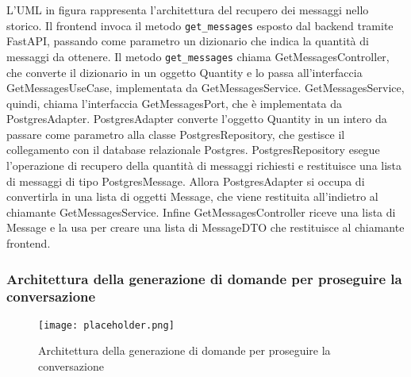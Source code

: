 L'UML in figura rappresenta l'architettura del recupero dei messaggi nello storico.
Il frontend invoca il metodo \texttt{get\_messages} esposto dal backend tramite FastAPI, passando come parametro un dizionario che indica la quantità di messaggi da ottenere.
Il metodo \texttt{get\_messages} chiama GetMessagesController, che converte il dizionario in un oggetto Quantity e lo passa all'interfaccia GetMessagesUseCase, implementata da GetMessagesService.
GetMessagesService, quindi, chiama l'interfaccia GetMessagesPort, che è implementata da PostgresAdapter.
PostgresAdapter converte l'oggetto Quantity in un intero da passare come parametro alla classe PostgresRepository, che gestisce il collegamento con il database relazionale Postgres. 
PostgresRepository esegue l’operazione di recupero della quantità di messaggi richiesti e restituisce una lista di messaggi di tipo PostgresMessage.
Allora PostgresAdapter si occupa di convertirla in una lista di oggetti Message, che viene restituita all'indietro al chiamante GetMessagesService.
Infine GetMessagesController riceve una lista di Message e la usa per creare una lista di MessageDTO che restituisce al chiamante frontend.

\newpage


\subsubsection{Architettura della generazione di domande per proseguire la conversazione}
\label{sec:architettura_generazione_domande_conversazione}

\begin{figure}[h]
    \centering
    \texttt{[image: placeholder.png]}
    \caption{Architettura della generazione di domande per proseguire la conversazione}
\end{figure}

